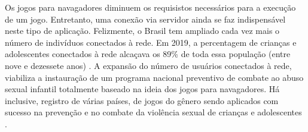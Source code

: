 Os jogos para navagadores diminuem os requisistos necessários para a execução de um jogo. Entretanto, uma conexão via servidor ainda se faz indispensável neste tipo de aplicação. Felizmente, o Brasil tem ampliado cada vez mais o número de indivíduos conectados à rede. Em 2019, a percentagem de crianças e adolescentes conectados à rede alcaçava os 89\% de toda essa população (entre nove e dezessete anos) \cite{brcetic}. A expansão do número de usuários conectados à rede, viabiliza a instauração de um programa nacional preventivo de combate ao abuso sexual infantil totalmente baseado na ideia dos jogos para navagadores. Há inclusive, registro de várias países, de jogos do gênero sendo aplicados com sucesso na prevenção e no combate da violência sexual de crianças e adolescentes \cite{jones2008online, fingerleabschlussbericht}. 





